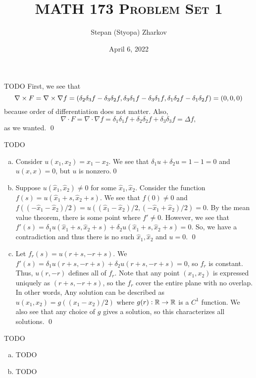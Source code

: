 \documentclass{article}
\title{\textsc{MATH 173 Problem Set 1}}
\author{Stepan (Styopa) Zharkov}
\date{April 6, 2022}
\newcommand{\D}{\nabla}
\renewcommand{\d}{\delta}
\begin{document}
\maketitle
{} TODO \tri
\hop
\solution
First, we see that 
\[\D \times F = \D \times \D f = \del{\d_2\d_3 f - \d_3\d_2 f,\d_3\d_1 f - \d_3\d_1 f, \d_1\d_2 f - \d_1\d_2 f} = (0,0,0)\]
because order of differentiation does not matter. Also, 
\[\D \cdot F = \D \cdot \D f = \d_1\d_1 f +  \d_2\d_2 f  + \d_3\d_3 f  = \Delta f,\]
as we wanted. \qed


\newpage
{} TODO \tri
\hop
\solution 
\begin{enumerate}[(a)]
    \item Consider $u(x_1, x_2) = x_1 - x_2$. We see that $\d_1u+\d_2u=1-1=0$ and $u(x,x)=0$, but $u$ is nonzero.\qed
    \item Suppose $u(\hat x_1, \hat x_2) \ne 0$ for some $\hat x_1, \hat x_2$. Consider the function $f(s) = u(\hat x_1 + s, \hat x_2 + s)$. We see that $f(0)\ne 0$ and $f((-\hat x_1 -\hat x_2)/2)= u((\hat x_1-\hat x_2)/2, (-\hat x_1+\hat x_2)/2) = 0$. By the mean value theorem, there is some point where $f' \ne 0$. 
    \hop
    However, we see that $f'(s) = \d_1u(\hat x_1+s,\hat x_2+s)+\d_2u(\hat x_1+s, \hat x_2+s) = 0$. So, we have a contradiction and thus there is no such $\hat x_1, \hat x_2$ and $u = 0$. \qed
    \item Let $f_r(s) = u(r+s,-r+s)$. We $f'(s) = \d_1u(r+s,-r+s)+\d_2u(r+s, -r+s) = 0$, so $f_r$ is constant. Thus, $u(r,-r)$ defines all of $f_r$. Note that any point $(x_1, x_2)$ is expressed uniquely as $(r+s, -r+s)$, so the $f_r$ cover the entire plane with no overlap. 
    \hop
    In other words, Any solution can be described as $u(x_1, x_2) = g((x_1-x_2)/2)$ where $g(r): \mathbb{R} \to \mathbb{R}$ is a $C^1$ function. We also see that any choice of $g$ gives a solution, so this characterizes all solutions. \qed
\end{enumerate}

\newpage
{} TODO \tri
\hop
\solution
\begin{enumerate}[(a)]
    \item TODO
    \item TODO
\end{enumerate}
\end{document}
